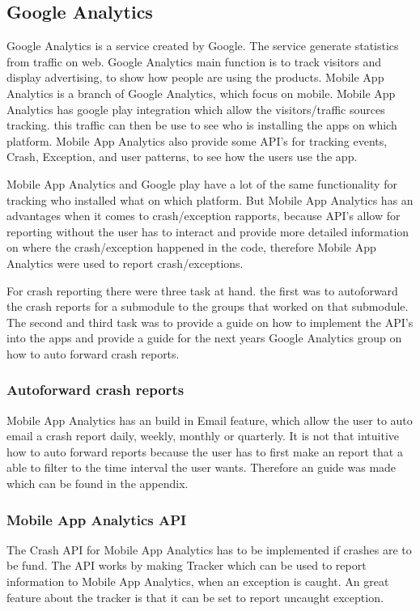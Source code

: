 \subsection{Google Analytics}
Google Analytics is a service created by Google. The service generate statistics from traffic on web. Google Analytics main function is to track visitors and display advertising, to show how people are using the products. Mobile App Analytics is a branch of  Google Analytics, which focus on mobile. Mobile App Analytics has google play integration which allow the visitors/traffic sources tracking. this traffic can then be use to see who is installing the apps on which platform. Mobile App Analytics also provide some API’s for tracking events, Crash, Exception, and user patterns, to see how the users use the app.

Mobile App Analytics and Google play have a lot of the same functionality for tracking who installed what on which platform. But Mobile App Analytics has an advantages when it comes to crash/exception rapports, because API’s allow for reporting without the user has to interact and provide more detailed information on where the crash/exception happened in the code, therefore Mobile App Analytics were used to report crash/exceptions.

For crash reporting there were three task at hand. the first was to autoforward the crash reports for a submodule to the groups that worked on that submodule. The second and third task was to provide a guide on how to implement the API’s into the apps and provide a guide for the next years Google Analytics group on how to auto forward crash reports. 

\subsubsection{Autoforward crash reports}
Mobile App Analytics has an build in Email feature, which allow the user to auto email a crash report daily, weekly, monthly or quarterly. It is not that intuitive how to auto forward reports because the user has to first make an report that a able to filter to the time interval the user wants. Therefore an guide was made which can be found in the appendix.

\subsubsection{Mobile App Analytics API}
The Crash API for Mobile App Analytics has to be implemented if crashes are to be fund. The API works by making Tracker which can be used to report information to Mobile App Analytics, when an exception is caught. An great feature about the tracker is that it can be set to report uncaught exception.  